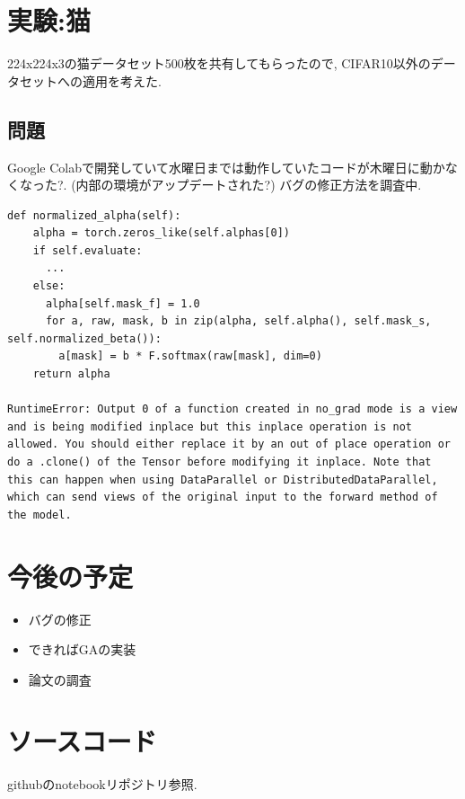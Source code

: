 \documentclass[twocolumn]{jarticle}     %
\begin{document}
\section{実験:猫}
224x224x3の猫データセット500枚を共有してもらったので,
CIFAR10以外のデータセットへの適用を考えた.

\subsection{問題}
Google Colabで開発していて水曜日までは動作していたコードが木曜日に動かなくなった?.
(内部の環境がアップデートされた?)
バグの修正方法を調査中.

\begin{table}[t]
\begin{lstlisting}[caption=error code,label=code]
def normalized_alpha(self):
    alpha = torch.zeros_like(self.alphas[0])
    if self.evaluate:
      ...
    else:
      alpha[self.mask_f] = 1.0
      for a, raw, mask, b in zip(alpha, self.alpha(), self.mask_s, self.normalized_beta()):
        a[mask] = b * F.softmax(raw[mask], dim=0)
    return alpha

RuntimeError: Output 0 of a function created in no_grad mode is a view and is being modified inplace but this inplace operation is not allowed. You should either replace it by an out of place operation or do a .clone() of the Tensor before modifying it inplace. Note that this can happen when using DataParallel or DistributedDataParallel, which can send views of the original input to the forward method of the model.
\end{lstlisting}
\end{table}


\section{今後の予定}

\begin{itemize}
  \item バグの修正
  \item できればGAの実装
  \item 論文の調査
\end{itemize}

\section{ソースコード}
githubのnotebookリポジトリ参照.



\end{document}
